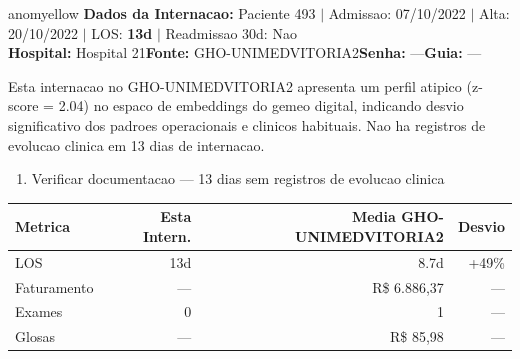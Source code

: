 \documentclass[a4paper,10pt]{article}
\begin{document}
\begin{anomalycard}[Internacao 405 | GHO-UNIMEDVITORIA2 | MODERADO (z=2.04)]{anomyellow}
\textbf{Dados da Internacao:} Paciente 493 $\mid$ Admissao: 07/10/2022 $\mid$ Alta: 20/10/2022 $\mid$ LOS: \textbf{13d} $\mid$ Readmissao 30d: Nao\\
\textbf{Hospital:} Hospital 21\quad\textbf{Fonte:} GHO-UNIMEDVITORIA2\quad\textbf{Senha:} ---\quad\textbf{Guia:} ---\\
\vspace{2pt}\begin{tcolorbox}[colback=severityred!20,colframe=anomyellow,title={\textbf{Interpretacao de Negocio}},fonttitle=\bfseries\small,left=4pt,right=4pt,top=3pt,bottom=3pt]
{\small Esta internacao no GHO-UNIMEDVITORIA2 apresenta um perfil atipico (z-score = 2.04) no espaco de embeddings do gemeo digital, indicando desvio significativo dos padroes operacionais e clinicos habituais. Nao ha registros de evolucao clinica em 13 dias de internacao.}
\end{tcolorbox}
\begin{tcolorbox}[colback=severityyellow!30,colframe=anomorange,title={\textbf{Recomendacoes Especificas}},fonttitle=\bfseries\small,left=4pt,right=4pt,top=3pt,bottom=3pt]
\begin{enumerate}[nosep,leftmargin=16pt]
\item {\small Verificar documentacao --- 13 dias sem registros de evolucao clinica}
\end{enumerate}
\end{tcolorbox}
\begin{center}\begin{tabular}{l r r r}\toprule\textbf{Metrica} & \textbf{Esta Intern.} & \textbf{Media GHO-UNIMEDVITORIA2} & \textbf{Desvio} \\\midrule
LOS & 13d & 8.7d & +49\% \\
Faturamento & --- & R\$ 6.886,37 & --- \\
Exames & 0 & 1 & --- \\
Glosas & --- & R\$ 85,98 & --- \\
\bottomrule\end{tabular}\end{center}


\end{anomalycard}
\end{document}
